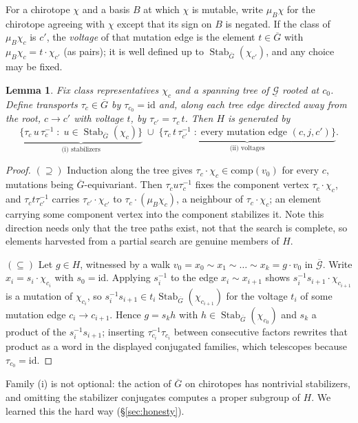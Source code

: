 \documentclass[11pt]{amsart}
\newtheorem{lemma}[theorem]{Lemma}
\theoremstyle{remark}
\newcommand{\Gb}{\overline{\mathcal{G}}}
\newcommand{\Gu}{\underline{\mathcal{G}}}
\newcommand{\Gbar}{\overline{G}}
\newcommand{\Stab}{\operatorname{Stab}}
\begin{document}
For a chirotope $\chi$ and a basis $B$ at which $\chi$ is mutable, write
$\mu_B\chi$ for the chirotope agreeing with $\chi$ except that its sign
on $B$ is negated. If the class of $\mu_B\chi_c$ is $c'$, the
\emph{voltage} of that mutation edge is the element $t\in\Gbar$ with
$\mu_B\chi_c=t\cdot\chi_{c'}$ (as pairs); it is well defined up to
$\Stab_{\Gbar}(\chi_{c'})$, and any choice may be fixed.

\begin{lemma}\label{lem:gens}
Fix class representatives $\chi_c$ and a spanning tree of $\Gu$ rooted at
$c_0$. Define transports $\tau_c\in\Gbar$ by $\tau_{c_0}=\mathrm{id}$
and, along each tree edge directed away from the root, $c\to c'$ with
voltage $t$, by $\tau_{c'}=\tau_c\,t$. Then $H$ is generated by
\[
  \underbrace{\{\tau_c\,u\,\tau_c^{-1}\;:\;u\in\Stab_{\Gbar}(\chi_c)\}}_{\text{(i) stabilizers}}
  \;\cup\;
  \underbrace{\{\tau_c\,t\,\tau_{c'}^{-1}\;:\;\text{every mutation edge }(c,j,c')\}}_{\text{(ii) voltages}} .
\]
\end{lemma}

\begin{proof}
$(\supseteq)$ Induction along the tree gives $\tau_c\cdot\chi_c\in
\mathrm{comp}(v_0)$ for every $c$, mutations being $\Gbar$-equivariant.
Then $\tau_c u\tau_c^{-1}$ fixes the component vertex $\tau_c\cdot\chi_c$,
and $\tau_c t\tau_{c'}^{-1}$ carries $\tau_{c'}\cdot\chi_{c'}$ to
$\tau_c\cdot(\mu_B\chi_c)$, a neighbour of $\tau_c\cdot\chi_c$; an
element carrying some component vertex into the component stabilizes it.
Note this direction needs only that the tree paths exist, not that the
search is complete, so elements harvested from a partial search are
genuine members of $H$.

$(\subseteq)$ Let $g\in H$, witnessed by a walk
$v_0=x_0\sim x_1\sim\dots\sim x_k=g\cdot v_0$ in $\Gb$. Write
$x_i=s_i\cdot\chi_{c_i}$ with $s_0=\mathrm{id}$. Applying $s_i^{-1}$ to
the edge $x_i\sim x_{i+1}$ shows $s_i^{-1}s_{i+1}\cdot\chi_{c_{i+1}}$ is
a mutation of $\chi_{c_i}$, so
$s_i^{-1}s_{i+1}\in t_i\Stab_{\Gbar}(\chi_{c_{i+1}})$ for the voltage
$t_i$ of some mutation edge $c_i\to c_{i+1}$. Hence $g=s_k h$ with
$h\in\Stab_{\Gbar}(\chi_{c_0})$ and $s_k$ a product of the $s_i^{-1}s_{i+1}$;
inserting $\tau_{c_i}^{-1}\tau_{c_i}$ between consecutive factors
rewrites that product as a word in the displayed conjugated families,
which telescopes because $\tau_{c_0}=\mathrm{id}$.
\end{proof}

Family (i) is not optional: the action of $\Gbar$ on chirotopes has
nontrivial stabilizers, and omitting the stabilizer conjugates computes a
proper subgroup of $H$. We learned this the hard way
(\S\ref{sec:honesty}).
\end{document}
